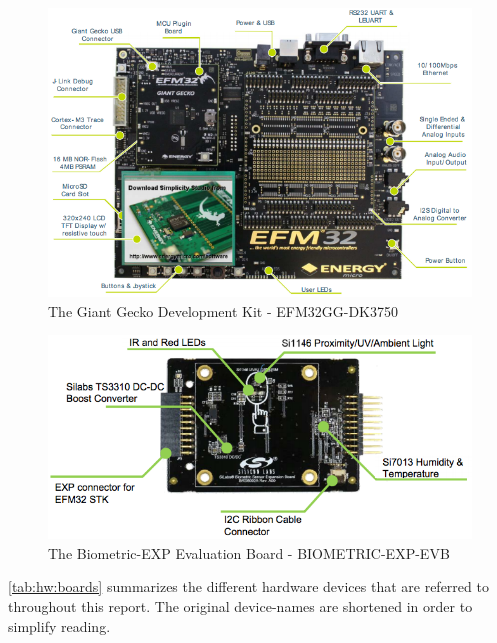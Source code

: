 \begin{figure}[H]
  \begin{center}
    \includegraphics[scale=0.5]{figures/efm32gg-dk3750}
  \end{center}
  \caption{The Giant Gecko Development Kit - EFM32GG-DK3750 \cite{Labs2013_DK}}
  \label{fig:efm32gg-dk3750}
\end{figure}

\begin{figure}[H]
  \begin{center}
    \includegraphics[scale=0.5]{figures/biometric-exp}
  \end{center}
  \caption{The Biometric-EXP Evaluation Board - BIOMETRIC-EXP-EVB \cite{Labs2014_BIO_EXP}}
  \label{fig:biometric-exp}
\end{figure}


\autoref{tab:hw:boards} summarizes the different hardware devices that are referred to throughout this report.
The original device-names are shortened in order to simplify reading.


